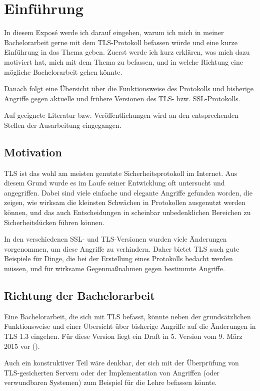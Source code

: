 
\chapter{Einführung}

In diesem Exposé werde ich darauf eingehen, warum ich mich in meiner Bachelorarbeit gerne mit dem TLS-Protokoll befassen würde und eine kurze Einführung in das Thema geben. Zuerst werde ich kurz erklären, was mich dazu motiviert hat, mich mit dem Thema zu befassen, und in welche Richtung eine mögliche Bachelorarbeit gehen könnte.

Danach folgt eine Übersicht über die Funktionsweise des Protokolls und bisherige Angriffe gegen aktuelle und frühere Versionen des TLS- bzw. SSL-Protokolls.

Auf geeignete Literatur bzw. Veröffentlichungen wird an den entsprechenden Stellen der Ausarbeitung eingegangen.

\section{Motivation}

TLS ist das wohl am meisten genutzte Sicherheitsprotokoll im Internet. Aus diesem Grund wurde es im Laufe seiner Entwicklung oft untersucht und angegriffen. Dabei sind viele einfache und elegante Angriffe gefunden worden, die zeigen, wie wirksam die kleinsten Schwächen in Protokollen ausgenutzt werden können, und das auch Entscheidungen in scheinbar unbedenklichen Bereichen zu Sicherheitslücken führen können. 

In den verschiedenen SSL- und TLS-Versionen wurden viele Änderungen vorgenommen, um diese Angriffe zu verhindern. Daher bietet TLS auch gute Beispiele für Dinge, die bei der Erstellung eines Protokolls bedacht werden müssen, und für wirksame Gegenmaßnahmen gegen bestimmte Angriffe.

\section{Richtung der Bachelorarbeit}

Eine Bachelorarbeit, die sich mit TLS befasst, könnte neben der grundsätzlichen Funktionsweise und einer Übersicht über bisherige Angriffe auf die Änderungen in TLS 1.3 eingehen. Für diese Version liegt ein Draft in 5. Version vom 9. März 2015 vor (\cite{tls13}). 

Auch ein konstruktiver Teil wäre denkbar, der sich mit der Überprüfung von TLS-gesicherten Servern oder der Implementation von Angriffen (oder verwundbaren Systemen) zum Beispiel für die Lehre befassen könnte. 